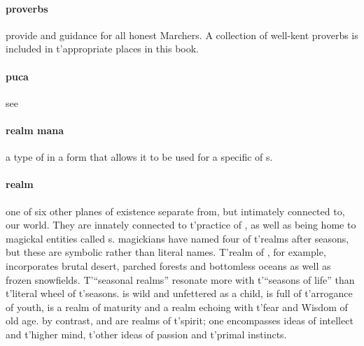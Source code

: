 \paragraph{proverbs} provide  and guidance for all honest Marchers. A collection of well-kent proverbs is included in t'\allowbreak appropriate places in this book.          
\paragraph{puca} see 
\paragraph{realm mana} a type of  in a form that allows it to be used for a specific  of s.
\paragraph{realm} one of six other planes of existence separate from, but intimately connected to, our world. They are innately connected to t'\allowbreak practice of , as well as being home to magickal entities called s. magickians have named four of t'\allowbreak realms after seasons, but these are symbolic rather than literal names. T'realm of , for example, incorporates brutal desert, parched forests and bottomless oceans as well as frozen snowfields. T'“seasonal realms” resonate more with t'\allowbreak “seasons of life” than t'\allowbreak literal wheel of t'\allowbreak seasons.  is wild and unfettered as a child,  is full of t'\allowbreak arrogance of youth,  is a realm of maturity and  a realm echoing with t'\allowbreak fear and Wisdom of old age. by contrast,  and  are realms of t'\allowbreak spirit; one encompasses ideas of intellect and t'\allowbreak higher mind, t'\allowbreak other ideas of passion and t'\allowbreak primal instincts.
